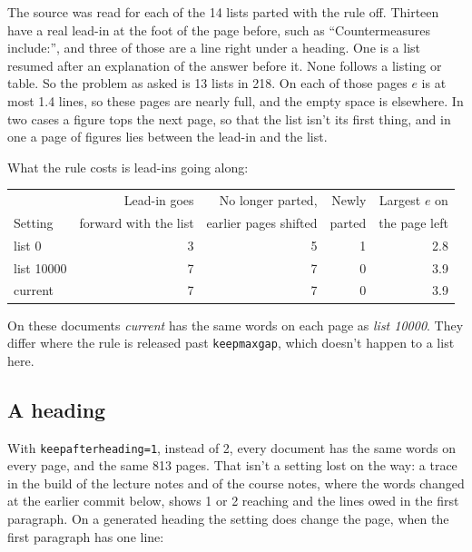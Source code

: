 The source was read for each of the 14 lists parted with the rule off.
Thirteen have a real lead-in at the foot of the page before, such as \enquote{Countermeasures
include:}, and three of those are a line right under a heading.
One is a list resumed after an explanation of the answer before it.
None follows a listing or table.
So the problem as asked is 13 lists in 218.
On each of those pages $e$ is at most 1.4 lines, so these pages are nearly full, and the empty space
is elsewhere.
In two cases a figure tops the next page, so that the list isn't its first thing, and in one a page
of figures lies between the lead-in and the list.

What the rule costs is lead-ins going along:
\begin{center}\small
\begin{tabular}{@{}lrrrr@{}}
\toprule
& Lead-in goes & No longer parted, & Newly & Largest $e$ on \\
Setting & forward with the list & earlier pages shifted & parted & the page left \\
\midrule
list 0 & 3 & 5 & 1 & 2.8 \\
list 10000 & 7 & 7 & 0 & 3.9 \\
current & 7 & 7 & 0 & 3.9 \\
\bottomrule
\end{tabular}
\end{center}

On these documents \emph{current} has the same words on each page as \emph{list 10000}.
They differ where the rule is released past \texttt{keepmaxgap}, which doesn't happen to a list here.

\subsection{A heading}

With \texttt{keepafterheading=1}, instead of 2, every document has the same words on every page, and
the same 813 pages.
That isn't a setting lost on the way: a trace in the build of the lecture notes and of the course
notes, where the words changed at the earlier commit below, shows 1 or 2 reaching
 and the lines owed in the first paragraph.
On a generated heading the setting does change the page, when the first paragraph has one line:

